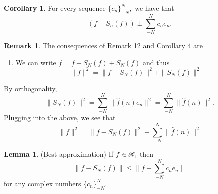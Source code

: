 \documentclass[10pt, oneside]{article}
\theoremstyle{definition}
\newtheorem{rem}{Remark}
\newtheorem{lem}{Lemma}
\newtheorem{cor}{Corollary}
\begin{document}
\begin{cor}
    For every sequence $\{c_n\}_{-N}^N,$ we have that 
    \[( f- S_n(f))\perp \sum_{-N}^N c_n e_n.\]
\end{cor}
\begin{rem}
The consequences of Remark 12 and Corollary 4 are 
    \begin{enumerate}
        \item We can write $f = f - S_N(f) + S_N(f)$ and thus
        \[\|f\|^2 = \|f - S_N(f)\|^2 + \|S_N(f)\|^2\]
    \end{enumerate}
    By orthogonality, 
    \[\|S_N(f)\|^2 = \sum_{-N}^N \|\hat{f}(n)e_n\|^2 = \sum_{-N}^N \|\hat{f}(n)\|^2.\] Plugging into the above, we see that
    \[\|f\|^2 = \|f - S_N(f)\|^2 + \sum_{-N}^N \|\hat{f}(n)\|^2\]
\end{rem}
\begin{lem}
    (Best approximation) If $f\in \cal R,$ then 
    \[\|f - S_N(f)\| \leq \|f - \sum_{-N}^N c_n e_n\|\] for any complex numbers $\{c_n\}_{-N}^N.$
\end{lem}
\end{document}
